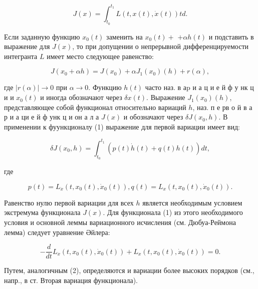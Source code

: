 \documentclass[10pt]{article}
\begin{document}
\[

J(x)=\int_{t_{0}}^{t_{1}} L(t, x(t), \dot{x}(t)) t d .

\]



Если заданную функцию $x_{0}(t)$ заменить на $x_{0}(t)+$ $+\alpha h(t)$ и подставить в выражение для $J(x)$, то при допущении о непрерывной дифференцируемости интегранта $L$ имеет место следующее равенство:



\[

J\left(x_{0}+\alpha h\right)=J\left(x_{0}\right)+\alpha J_{1}\left(x_{0}\right)(h)+r(\alpha),

\]



где $|r(\alpha)| \rightarrow 0$ при $\alpha \rightarrow 0$. Функцию $h(t)$ часто наз. в а$\mathrm{p}$ и а ц и е й ф у нк ц и и $x_{0}(t)$ и иногда обозначают через $\delta x(t)$. Выражение $J_{1}\left(x_{0}\right)(h)$, представляющее собой функционал относительно вариаций $h$, наз. п е рв о й в а р и а ци е й ф унк ц и он а л а $J(x)$ и обозначают через $\delta J\left(x_{0}, h\right)$. В применении к фуункционалу (1) выражение для первой вариации имеет вид:



\[

\delta J\left(x_{0}, h\right)=\int_{t_{0}}^{t_{1}}(p(t) \dot{h}(t)+q(t) h(t)) d t,

\]



где



\[

p(t)=L_{\dot{x}}\left(t, x_{0}(t), \dot{x}_{0}(t)\right), q(t)=L_{x}\left(t, x_{0}(t), \dot{x}_{0}(t)\right) .

\]



Равенство нулю первой вариации для всех $h$ является необходимым условием экстремума функционала $J(x)$. Для функционала (1) из этого необходимого условия и основной леммы вариационного исчисления (см. Дюбуа-Реймона лемма) следует уравнение Әйлера:



\[

-\frac{d}{d t} L_{\dot{x}}\left(t, x_{0}(t), \dot{x}_{0}(t)\right)+L_{x}\left(t, x_{0}(t), \dot{x}_{0}(t)\right)=0 .

\]



Путем, аналогичным (2), определяются и вариации более высоких порядков (см., напр., в ст. Вторая вариация функционала).
\end{document}
